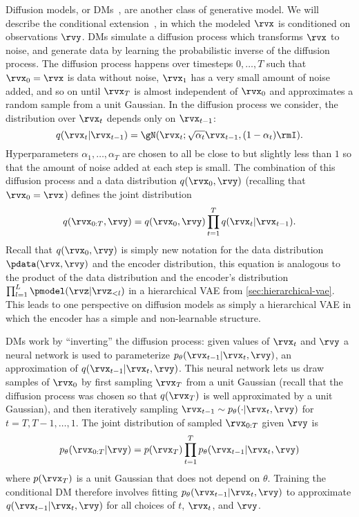 Diffusion models, or DMs~\citep{sohl2015deep,ho2020denoising,nichol2021improved,song2020score}, are another class of generative model. We will describe the conditional extension~\citep{tashiro2021csdi}, in which the modeled $\rvx$ is conditioned on observations $\rvy$. DMs simulate a diffusion process which transforms $\rvx$ to noise, and generate data by learning the probabilistic inverse of the diffusion process. The diffusion process happens over timesteps $0,\ldots,T$ such that $\rvx_0=\rvx$ is data without noise, $\rvx_1$ has a very small amount of noise added, and so on until $\rvx_T$ is almost independent of $\rvx_0$ and approximates a random sample from a unit Gaussian. In the diffusion process we consider, the distribution over $\rvx_t$ depends only on $\rvx_{t-1}$:
\begin{equation} \label{eq:q-step}
    q(\rvx_t | \rvx_{t-1}) = \gN(\rvx_t ; \sqrt{\alpha_t}  \rvx_{t-1} , (1-\alpha_t) \rmI ).
\end{equation}
Hyperparameters $\alpha_1,\ldots,\alpha_T$ are chosen to all be close to but slightly less than $1$ so that the amount of noise added at each step is small.
The combination of this diffusion process and a data distribution $q(\rvx_0,\rvy)$ (recalling that $\rvx_0=\rvx$) defines the joint distribution
\begin{equation} \label{eq:q-joint}
    q(\rvx_{0:T}, \rvy) = q(\rvx_0, \rvy) \prod_{t=1}^T q(\rvx_t|\rvx_{t-1}).
\end{equation}
Recall that $q(\rvx_0, \rvy)$ is simply new notation for the data distribution $\pdata(\rvx,\rvy)$ and the encoder distribution, this equation is analogous to the product of the data distribution and the encoder's distribution
$\prod_{l=1}^L \pmodel(\rvz|\rvz_{<l})$ in a hierarchical VAE from \cref{sec:hierarchical-vae}. This leads to one perspective on diffusion models as simply a hierarchical VAE in which the encoder has a simple and non-learnable structure.

DMs work by ``inverting'' the diffusion process: given values of $\rvx_t$ and $\rvy$ a neural network is used to parameterize $p_\theta(\rvx_{t-1}|\rvx_t, \rvy)$, an approximation of $q(\rvx_{t-1}|\rvx_t,\rvy)$. This neural network lets us draw samples of $\rvx_0$ by first sampling $\rvx_T$ from a unit Gaussian (recall that the diffusion process was chosen so that $q(\rvx_T)$ is well approximated by a unit Gaussian), and then iteratively sampling $\rvx_{t-1} \sim p_\theta(\cdot|\rvx_t,\rvy)$ for $t=T,T-1,\ldots,1$. The joint distribution of sampled $\rvx_{0:T}$ given $\rvy$ is
\begin{equation} \label{eq:p-joint}
    p_\theta(\rvx_{0:T}|\rvy) = p(\rvx_{T}) \prod_{t=1}^T p_\theta(\rvx_{t-1}|\rvx_t, \rvy)
\end{equation}
where $p(\rvx_{T})$ is a unit Gaussian that does not depend on $\theta$. Training the conditional DM therefore involves fitting $p_\theta(\rvx_{t-1}|\rvx_t,\rvy)$ to approximate $q(\rvx_{t-1}|\rvx_t, \rvy)$ for all choices of $t$, $\rvx_t$, and $\rvy$.

